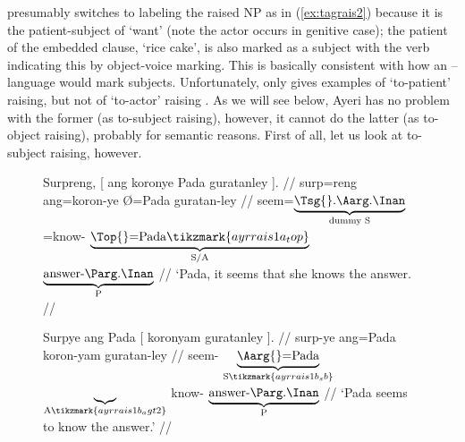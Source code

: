 \citet{kroeger1991} presumably switches to labeling the raised NP as \Abs{} in
(\ref{ex:tagrais2}) because it is the patient-subject of  `want'
(note the actor  occurs in genitive case); the patient of the embedded
clause,  `rice cake', is also marked as a subject with the verb
indicating this by object-voice marking. This is basically consistent with how
an \Erg{}--\Abs{} language would mark subjects. Unfortunately,
\citet{kroeger1991} only gives examples of `to-patient' raising, but not of
`to-actor' raising \citep[430]{carnie2013}. As we will see below, Ayeri has no
problem with the former (as to-subject raising), however, it cannot do the
latter (as to-object raising), probably for semantic reasons. First of all, let
us look at to-subject raising, however.

\begin{figure}
\pex\label{ex:ayrrais1}
\a\label{ex:ayrrais1_1}\begingl[aboveglcskip=1.5em]
	\gla Surpreng, \textup{[} {ang koronye} Pada guratanley
		\textup{]}. //
	\glb surp=reng {} ang=koron-ye Ø=Pada guratan-ley {} //
	\glc seem=$\underbrace{\text{\smash{\Tsg{}}.\AargI{}}}_{\text{dummy S}}$
		{}
		\AgtT{}=know-\TsgF{}%
		$\underbrace{\text{\Top{}=Pada}%
			\tikzmark{ayrrais1a_top}%
		}_{\text{S/A}}$
		$\underbrace{\text{answer-\PargI{}}}_{\text{P}}$
		{}
		//
	\glft `Pada, it seems that she knows the answer. //
\endgl
{}

\a\label{ex:ayrrais1_2}\begingl[aboveglftskip=1.75em]
	\gla Surpye {ang Pada} \textup{[} {} koronyam guratanley
		\textup{]}. //
	\glb surp-ye ang=Pada {} {} koron-yam guratan-ley {} //
	\glc seem-\TsgF{}
		$\underbrace{\text{\Aarg{}=Pada}}_{\text{S}%
			\tikzmark{ayrrais1b_sb}%
		}$
		{}
		$\underbrace{}_{\text{A}%
			\tikzmark{ayrrais1b_agt2}%
		}$
		know-\Ptcp{}
		$\underbrace{\text{answer-\PargI{}}}_{\text{P}}$
		{}
		//
	\glft `Pada seems to know the answer.' //
\endgl
{}


\end{figure}
